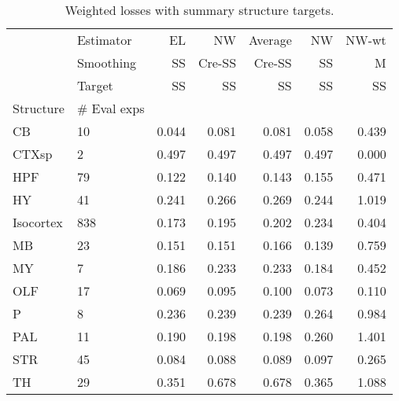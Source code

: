 \documentclass[NETN,manuscript]{stjour-new}
\begin{document}
\newpage 
\begin{table}[H]
\begin{adjustbox}{width=.5\columnwidth,center}

\begin{tabular}{ll|rrrrr}
\toprule
   & Estimator &     EL &     NW & Average &     NW &  NW-wt \\
   & Smoothing &     SS & Cre-SS &  Cre-SS &     SS &      M \\
   & Target &     SS &     SS &      SS &     SS &     SS \\
Structure & \# Eval exps &        &        &         &        &        \\
\midrule
\hline
CB & 10 &  0.044 &  0.081 &   0.081 &  0.058 &  0.439 \\
CTXsp & 2 &  0.497 &  0.497 &   0.497 &  0.497 &  0.000 \\
HPF & 79 &  0.122 &  0.140 &   0.143 &  0.155 &  0.471 \\
HY & 41 &  0.241 &  0.266 &   0.269 &  0.244 &  1.019 \\
Isocortex & 838 &  0.173 &  0.195 &   0.202 &  0.234 &  0.404 \\
MB & 23 &  0.151 &  0.151 &   0.166 &  0.139 &  0.759 \\
MY & 7 &  0.186 &  0.233 &   0.233 &  0.184 &  0.452 \\
OLF & 17 &  0.069 &  0.095 &   0.100 &  0.073 &  0.110 \\
P & 8 &  0.236 &  0.239 &   0.239 &  0.264 &  0.984 \\
PAL & 11 &  0.190 &  0.198 &   0.198 &  0.260 &  1.401 \\
STR & 45 &  0.084 &  0.088 &   0.089 &  0.097 &  0.265 \\
TH & 29 &  0.351 &  0.678 &   0.678 &  0.365 &  1.088 \\
\bottomrule
\end{tabular}
\end{adjustbox}
\caption{Weighted losses with summary structure targets.}
\end{table}
\end{document}
